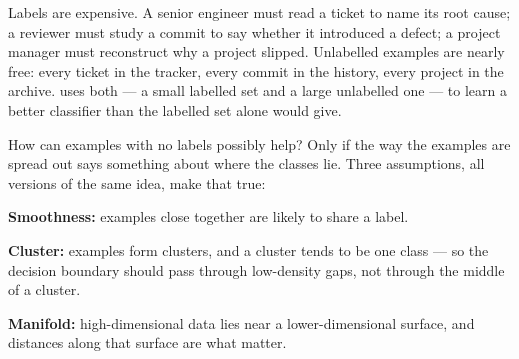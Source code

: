 Labels are expensive. A senior engineer must read a ticket to name its root
cause; a reviewer must study a commit to say whether it introduced a defect; a
project manager must reconstruct why a project slipped. Unlabelled examples are
nearly free: every ticket in the tracker, every commit in the history, every
project in the archive.
 uses both --- a small labelled set and a large
unlabelled one --- to learn a better classifier than the labelled set alone would
give.

How can examples with no labels possibly help? Only if the way the examples are
spread out says something about where the classes lie. Three assumptions, all
versions of the same idea, make that true:
\begin{tight}
  \item \textbf{Smoothness:} examples close together are likely to share a label.
  \item \textbf{Cluster:} examples form clusters, and a cluster tends to be one
        class --- so the decision boundary should pass through low-density gaps,
        not through the middle of a cluster.
  \item \textbf{Manifold:} high-dimensional data lies near a lower-dimensional
        surface, and distances along that surface are what matter.
\end{tight}

